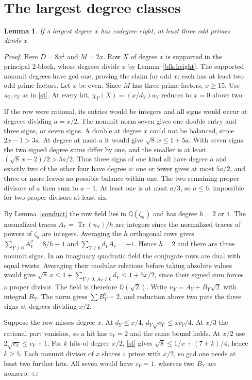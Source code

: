 \documentclass[11pt]{amsart}
\numberwithin{equation}{section}
\newtheorem{lemma}[theorem]{Lemma}
\DeclareMathOperator{\Tr}{Tr}
\newcommand{\QQ}{\mathbb Q}
\begin{document}
\section{The largest degree classes}\label{sec:large}
\begin{lemma}\label{lem:eight-support}
If a largest degree $x$ has codegree eight, at least three odd primes divide $x$.
\end{lemma}
\begin{proof}
Here $D=8x^2$ and $M=2x$. Row $X$ of degree $x$ is supported in the
principal $2$-block, whose degrees divide $x$ by Lemma~\ref{blk:height}.
The supported nonunit degrees have gcd one, proving the claim for odd $x$:
each has at least two odd prime factors. Let $x$ be even. Since $M$ has
three prime factors, $x\ge15$. Use $u_Y,c_Y$ as in \eqref{st}. At every
hit, $\chi_Y(X)=(x/d_Y)u_Y$ reduces to $x=0$ above two.

If the row were rational, its entries would be integers and all signs
would occur at degrees dividing $a=x/2$. The nonunit norm seven gives
one double entry and three signs, or seven signs. A double at degree
$x$ could not be balanced, since $2x-1>3a$. At degree at most $a$ it
would give $\sqrt8\,x\le1+5a$. With seven signs the two signed degree
sums differ by one, and the smaller is at least $(\sqrt8\,x-2)/2>5a/2$.
Thus three signs of one kind all have degree $a$ and exactly two of the
other four have degree $a$: one or fewer gives at most $5a/2$, and
three or more leaves no possible balance within one. The two remaining
proper divisors of $a$ then sum to $a-1$. At least one is at most $a/3$,
so $a\le6$, impossible for two proper divisors at least six.

By Lemma~\ref{conduct} the row field lies in $\QQ(\zeta_8)$ and has degree
$h=2$ or $4$. The normalized traces $A_Y=\Tr(u_Y)/h$ are integers
since the normalized traces of powers of $\zeta_8$ are integers.
Averaging the $h$ orthogonal rows gives $\sum_{Y\ne0} A_Y^2=8/h-1$ and
$\sum_{Y\ne0}d_YA_Y=-1$. Hence $h=2$ and there are three nonunit signs.
In an imaginary quadratic field the conjugate rows are dual with equal
twists. Averaging their modular relations before taking absolute values
would give $\sqrt8\,x\le1+\sum_{Y\ne0,\,A_Y\ne0}d_Y\le1+5x/2$,
since their signed sum forces a proper divisor. The field is therefore
$\QQ(\sqrt2)$. Write $u_Y=A_Y+B_Y\sqrt2$ with integral $B_Y$. The norm
gives $\sum B_Y^2=2$, and reduction above two puts the three signs at
degrees dividing $x/2$.

Suppose the row misses degree $x$. At $d_Y\le x/4$,
$d_Y\sqrt{c_Y}\le xc_Y/4$. At $x/3$ the rational part vanishes, so a
hit has $c_Y=2$ and the same bound holds. At $x/2$ use
$2\sqrt{c_Y}\le c_Y+1$. For $k$ hits of degree $x/2$, \eqref{st} gives
$\sqrt8\le1/x+(7+k)/4$, hence $k\ge5$. Each nonunit divisor of $x$
shares a prime with $x/2$, so gcd one needs at least two further hits.
All seven would have $c_Y=1$, whereas two $B_Y$ are nonzero.


\end{proof}
\end{document}
